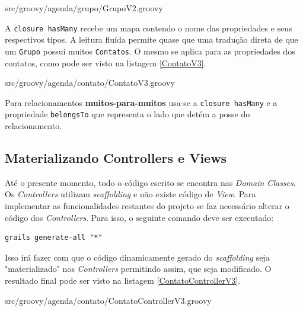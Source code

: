 \documentclass[12pt]{article}
\begin{document}
    
                    {src/groovy/agenda/grupo/GrupoV2.groovy}
    
    A \texttt{closure hasMany} recebe um mapa contendo o nome das propriedades e seus respectivos
    tipos. A leitura fluída permite quase que uma tradução direta de que um \texttt{Grupo}
    possui muitos \texttt{Contatos}. O mesmo se aplica para as propriedades dos contatos, 
    como pode ser visto na listagem \ref{ContatoV3}.
    
    
                    {src/groovy/agenda/contato/ContatoV3.groovy}
    
    Para relacionamentos \textbf{muitos-para-muitos} usa-se a \texttt{closure hasMany} e a 
    propriedade \texttt{belongsTo} que representa o lado que detém a posse do relacionamento.
    

\subsection{Materializando Controllers e Views}
    
    Até o presente momento, todo o código escrito se encontra nas \emph{Domain Classes}.
    Os \emph{Controllers} utilizam \emph{scaffolding} e não existe código de \emph{View}. Para implementar
    as funcionalidades restantes do projeto se faz necessário alterar o código dos
    \emph{Controllers}. Para isso, o seguinte comando deve ser executado:
    
    \begin{lstlisting}[basicstyle={\small \ttfamily}]
           grails generate-all "*"
    \end{lstlisting}
    
    Isso irá fazer com que o código dinamicamente gerado do \emph{scaffolding} seja "materializado"
    nos \emph{Controllers} permitindo assim, que seja modificado. O resultado final pode
    ser visto na listagem \ref{ContatoControllerV3}.
    
    
                   {src/groovy/agenda/contato/ContatoControllerV3.groovy}
    
\end{document}
